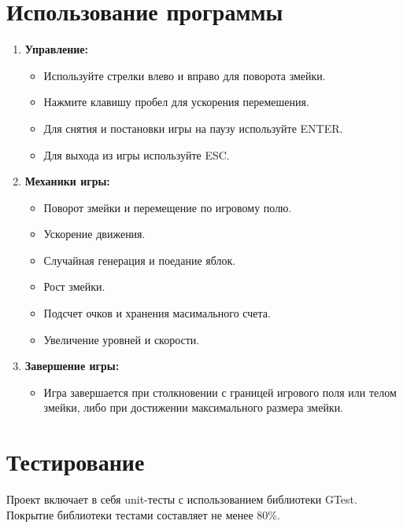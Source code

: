\documentclass{article}
\begin{document}
\section{Использование программы}

\begin{enumerate}
    \item \textbf{Управление:}
        \begin{itemize}
            \item Используйте стрелки влево и вправо для поворота змейки.
            \item Нажмите клавишу пробел для ускорения перемешения.
            \item Для снятия и постановки игры на паузу используйте ENTER.
            \item Для выхода из игры используйте ESC.
        \end{itemize}
    \item \textbf{Механики игры:}
        \begin{itemize}
            \item Поворот змейки и перемещение по игровому полю.
            \item Ускорение движения.
            \item Случайная генерация и поедание яблок.
            \item Рост змейки.
            \item Подсчет очков и хранения масимального счета.
            \item Увеличение уровней и скорости.
        \end{itemize}
    \item \textbf{Завершение игры:}
        \begin{itemize}
            \item Игра завершается при столкновении с границей игрового поля или телом змейки, либо при достижении максимального размера змейки.
        \end{itemize}
\end{enumerate}

\section{Тестирование}

Проект включает в себя unit-тесты с использованием библиотеки GTest. Покрытие библиотеки тестами составляет не менее 80\%.
\end{document}
